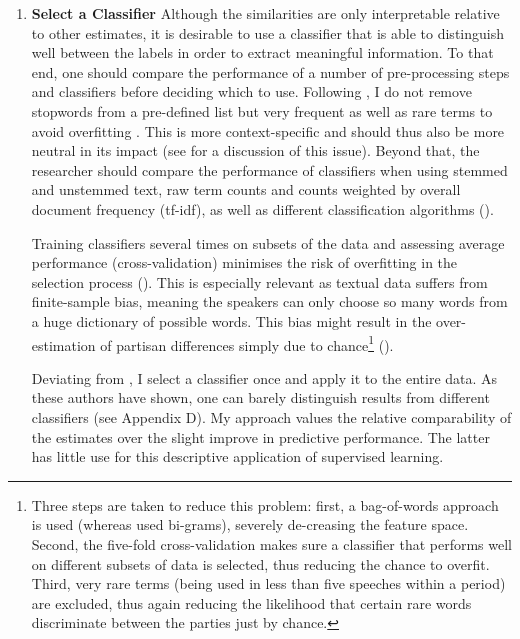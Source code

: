 \documentclass{article}
\begin{document}
\begin{enumerate}
    \item \textbf{Select a Classifier} \newline Although the similarities are only interpretable relative to other estimates, it is desirable to use a classifier that is able to distinguish well between the labels in order to extract meaningful information. To that end, one should compare the performance of a number of pre-processing steps and classifiers before deciding which to use. Following \citeauthor{Peterson2018}, I do not remove stopwords from a pre-defined list but very frequent as well as rare terms to avoid overfitting \citeyear{Peterson2018}. This is more context-specific and should thus also be more neutral in its impact (see \cite{Schoonvelde2019a} for a discussion of this issue). Beyond that, the researcher should compare the performance of classifiers when using stemmed and unstemmed text, raw term counts and counts weighted by overall document frequency (tf-idf), as well as different classification algorithms (\cite{Denny2018}).\par 
    Training classifiers several times on subsets of the data and assessing average performance (cross-validation) minimises the risk of overfitting in the selection process (\cite{Breiman1989}). This is especially relevant as textual data suffers from finite-sample bias, meaning the speakers can only choose so many words from a huge dictionary of possible words. This bias might result in the over-estimation of partisan differences simply due to chance\footnote{Three steps are taken to reduce this problem: first, a bag-of-words approach is used (whereas \citeauthor{Gentzkow2019} used bi-grams), severely de-creasing the feature space. Second, the five-fold cross-validation makes sure a classifier that performs well on different subsets of data is selected, thus reducing the chance to overfit. Third, very rare terms (being used in less than five speeches within a period) are excluded, thus again reducing the likelihood that certain rare words discriminate between the parties just by chance.} (\cite{Gentzkow2019}).  \par
    Deviating from \citeauthor{Peterson2018}, I select a classifier once and apply it to the entire data. As these authors have shown, one can barely distinguish results from different classifiers (see Appendix D). My approach values the relative comparability of the estimates over the slight improve in predictive performance. The latter has little use for this descriptive application of supervised learning. \par

\end{enumerate}
\end{document}
